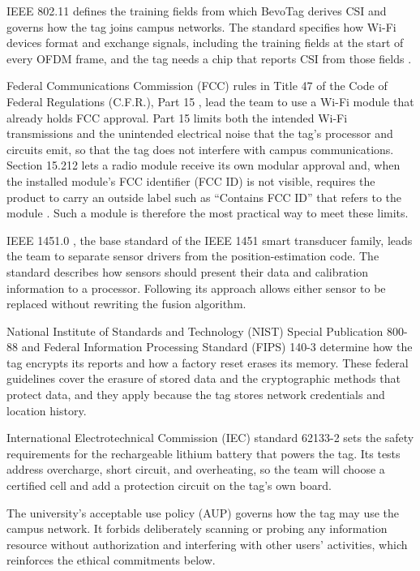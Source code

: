 \documentclass[12pt,letterpaper]{article}
\begin{document}
IEEE 802.11 \cite{std80211} defines the training fields from which BevoTag derives CSI and governs
how the tag joins campus networks. The standard specifies how Wi-Fi devices format and exchange
signals, including the training fields at the start of every OFDM frame, and the tag needs a chip
that reports CSI from those fields \cite{espcsi}.

Federal Communications Commission (FCC) rules in Title 47 of the Code of Federal Regulations
(C.F.R.), Part 15 \cite{fcc15}, lead the team to use a Wi-Fi module that already holds FCC approval.
Part 15 limits both the intended Wi-Fi transmissions and the unintended electrical noise that the
tag's processor and circuits emit, so that the tag does not interfere with campus communications.
Section 15.212 lets a radio module receive its own modular approval and, when the installed
module's FCC identifier (FCC ID) is not visible, requires the product to carry an outside label such
as ``Contains FCC ID'' that refers to the module \cite{fcc15}. Such a module is therefore the most
practical way to meet these limits.

IEEE 1451.0 \cite{std1451}, the base standard of the IEEE 1451 smart transducer family, leads the
team to separate sensor drivers from the position-estimation code. The standard describes how
sensors should present their data and calibration information to a processor. Following its
approach allows either sensor to be replaced without rewriting the fusion algorithm.

National Institute of Standards and Technology (NIST) Special Publication 800-88 \cite{nist80088}
and Federal Information Processing Standard (FIPS) 140-3 \cite{fips1403} determine how the tag
encrypts its reports and how a factory reset erases its memory. These federal guidelines cover the
erasure of stored data and the cryptographic methods that protect data, and they apply because the
tag stores network credentials and location history.

International Electrotechnical Commission (IEC) standard 62133-2 \cite{iec62133} sets the safety
requirements for the rechargeable lithium battery that powers the tag. Its tests address
overcharge, short circuit, and overheating, so the team will choose a certified cell and add a
protection circuit on the tag's own board.

The university's acceptable use policy (AUP) \cite{utaup} governs how the tag may use the campus
network. It forbids deliberately scanning or probing any information resource without authorization
and interfering with other users' activities, which reinforces the ethical commitments below.
\end{document}
